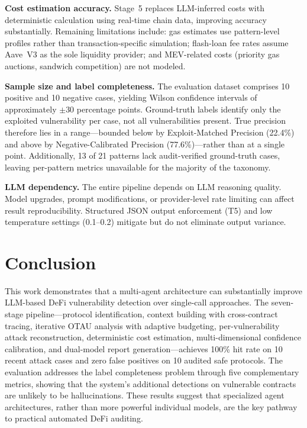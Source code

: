 \documentclass[10pt]{article}
\begin{document}
\textbf{Cost estimation accuracy.} Stage~5 replaces LLM-inferred costs with deterministic calculation using real-time chain data, improving accuracy substantially. Remaining limitations include: gas estimates use pattern-level profiles rather than transaction-specific simulation; flash-loan fee rates assume Aave~V3 as the sole liquidity provider; and MEV-related costs (priority gas auctions, sandwich competition) are not modeled.

\textbf{Sample size and label completeness.} The evaluation dataset comprises 10 positive and 10 negative cases, yielding Wilson confidence intervals of approximately $\pm$30 percentage points. Ground-truth labels identify only the exploited vulnerability per case, not all vulnerabilities present. True precision therefore lies in a range---bounded below by Exploit-Matched Precision (22.4\%) and above by Negative-Calibrated Precision (77.6\%)---rather than at a single point. Additionally, 13 of 21 patterns lack audit-verified ground-truth cases, leaving per-pattern metrics unavailable for the majority of the taxonomy.

\textbf{LLM dependency.} The entire pipeline depends on LLM reasoning quality. Model upgrades, prompt modifications, or provider-level rate limiting can affect result reproducibility. Structured JSON output enforcement (T5) and low temperature settings (0.1--0.2) mitigate but do not eliminate output variance.

\section{Conclusion}

This work demonstrates that a multi-agent architecture can substantially improve LLM-based DeFi vulnerability detection over single-call approaches. The seven-stage pipeline---protocol identification, context building with cross-contract tracing, iterative OTAU analysis with adaptive budgeting, per-vulnerability attack reconstruction, deterministic cost estimation, multi-dimensional confidence calibration, and dual-model report generation---achieves 100\% hit rate on 10 recent attack cases and zero false positives on 10 audited safe protocols. The evaluation addresses the label completeness problem through five complementary metrics, showing that the system's additional detections on vulnerable contracts are unlikely to be hallucinations. These results suggest that specialized agent architectures, rather than more powerful individual models, are the key pathway to practical automated DeFi auditing.
\end{document}
